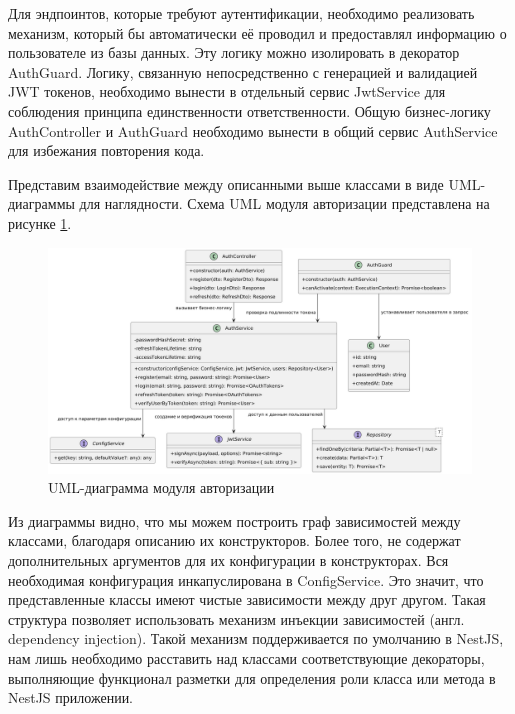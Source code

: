 	Для эндпоинтов, которые требуют аутентификации, необходимо реализовать механизм, который бы автоматически её проводил и предоставлял информацию о пользователе из базы данных. Эту логику можно изолировать в декоратор AuthGuard. Логику, связанную непосредственно с генерацией и валидацией JWT токенов, необходимо вынести в отдельный сервис JwtService для соблюдения принципа единственности ответственности. Общую бизнес-логику AuthController и AuthGuard необходимо вынести в общий сервис AuthService для избежания повторения кода.

	Представим взаимодействие между описанными выше классами в виде UML-диаграммы для наглядности. Схема UML модуля авторизации представлена на рисунке \ref{fig:uml_auth}.

	\begin{figure}[ht!] 
		\center
		\includegraphics [scale=0.2] {my_folder/images//uml_auth}
		\caption{UML-диаграмма модуля авторизации} 
		\label{fig:uml_auth}  
	\end{figure}

	Из диаграммы видно, что мы можем построить граф зависимостей между классами, благодаря описанию их конструкторов. Более того, не содержат дополнительных аргументов для их конфигурации в конструкторах. Вся необходимая конфигурация инкапуслирована в ConfigService. Это значит, что представленные классы имеют чистые зависимости между друг другом. Такая структура позволяет использовать механизм инъекции зависимостей (англ. dependency injection). Такой механизм поддерживается по умолчанию в NestJS, нам лишь необходимо расставить над классами соответствующие декораторы, выполняющие функционал разметки для определения роли класса или метода в NestJS приложении.

